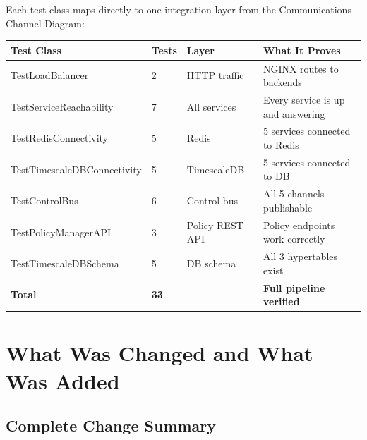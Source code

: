 \documentclass[12pt, a4paper]{article}
\begin{document}
Each test class maps directly to one integration layer from the Communications
Channel Diagram:

\begin{center}
\begin{tabularx}{\textwidth}{lllX}
  \toprule
  \textbf{Test Class} & \textbf{Tests} & \textbf{Layer} & \textbf{What It Proves} \\
  \midrule
  TestLoadBalancer       & 2  & HTTP traffic    & NGINX routes to backends \\
  TestServiceReachability & 7  & All services    & Every service is up and answering \\
  TestRedisConnectivity  & 5  & Redis           & 5 services connected to Redis \\
  TestTimescaleDBConnectivity & 5 & TimescaleDB  & 5 services connected to DB \\
  TestControlBus         & 6  & Control bus     & All 5 channels publishable \\
  TestPolicyManagerAPI   & 3  & Policy REST API & Policy endpoints work correctly \\
  TestTimescaleDBSchema  & 5  & DB schema       & All 3 hypertables exist \\
  \midrule
  \textbf{Total}         & \textbf{33} & & \textbf{Full pipeline verified} \\
  \bottomrule
\end{tabularx}
\end{center}

\section{What Was Changed and What Was Added}

\subsection{Complete Change Summary}
\end{document}
